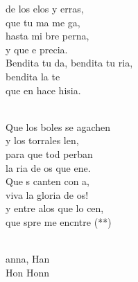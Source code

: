 \documentclass[12pt]{article}
\begin{document}
\begin{multicols*}{2}
\begin{cancion}%
	 de los elos y erras, \\
	 que tu ma me ga,\\
	hasta mi bre perna, \\
	y que e  precia.\\
	Bendita tu da, bendita tu ria,\\
	bendita la te\\
	que en  hace hisia.\\\jump\\
	\begin{chorus}%
	Que los boles se agachen \\
	y los torrales len,\\
	para que tod perban \\
	la ria de os que ene.\\
	Que s canten con a, \\
	viva la gloria de os!\\
	y entre alos que lo cen, \\
	que spre me encntre (**)\\
	\end{chorus}%
	\jump\\
	anna, Han\\
	Hon Honn\\
\end{cancion}%


\end{multicols*}
\end{document}
